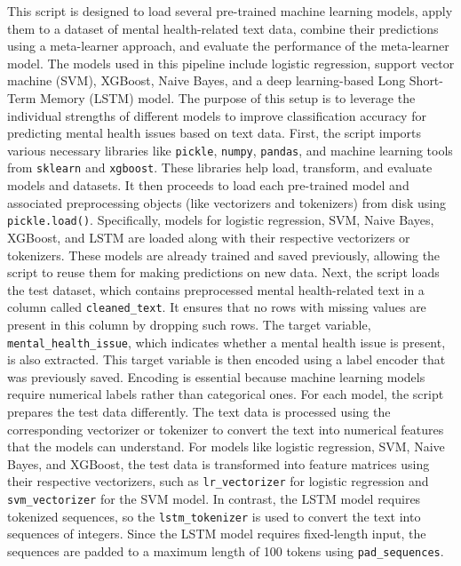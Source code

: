 \noindent
This script is designed to load several pre-trained machine learning models, apply them to a dataset of mental health-related text data, combine their predictions using a meta-learner approach, and evaluate the performance of the meta-learner model. The models used in this pipeline include logistic regression, support vector machine (SVM), XGBoost, Naive Bayes, and a deep learning-based Long Short-Term Memory (LSTM) model. The purpose of this setup is to leverage the individual strengths of different models to improve classification accuracy for predicting mental health issues based on text data. First, the script imports various necessary libraries like \texttt{pickle}, \texttt{numpy}, \texttt{pandas}, and machine learning tools from \texttt{sklearn} and \texttt{xgboost}. These libraries help load, transform, and evaluate models and datasets. It then proceeds to load each pre-trained model and associated preprocessing objects (like vectorizers and tokenizers) from disk using \texttt{pickle.load()}. Specifically, models for logistic regression, SVM, Naive Bayes, XGBoost, and LSTM are loaded along with their respective vectorizers or tokenizers. These models are already trained and saved previously, allowing the script to reuse them for making predictions on new data. Next, the script loads the test dataset, which contains preprocessed mental health-related text in a column called \texttt{cleaned\_text}. It ensures that no rows with missing values are present in this column by dropping such rows. The target variable, \texttt{mental\_health\_issue}, which indicates whether a mental health issue is present, is also extracted. This target variable is then encoded using a label encoder that was previously saved. Encoding is essential because machine learning models require numerical labels rather than categorical ones. For each model, the script prepares the test data differently. The text data is processed using the corresponding vectorizer or tokenizer to convert the text into numerical features that the models can understand. For models like logistic regression, SVM, Naive Bayes, and XGBoost, the test data is transformed into feature matrices using their respective vectorizers, such as \texttt{lr\_vectorizer} for logistic regression and \texttt{svm\_vectorizer} for the SVM model. In contrast, the LSTM model requires tokenized sequences, so the \texttt{lstm\_tokenizer} is used to convert the text into sequences of integers. Since the LSTM model requires fixed-length input, the sequences are padded to a maximum length of 100 tokens using \texttt{pad\_sequences}.

